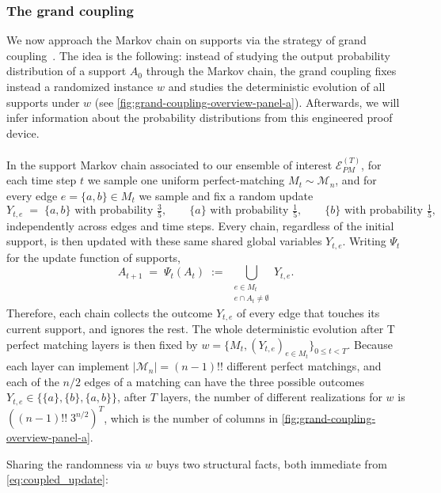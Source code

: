 \documentclass[
    aps,
    superscriptaddress,
    onecolumn,
    10pt,
    prx,
    nofootinbib
]{revtex4-2}
\theoremstyle{namedstatement}
\theoremstyle{plain}
\begin{document}
\subsubsection{The grand coupling}\label{sec:grandcoupling}
We now approach the Markov chain on supports via the strategy of grand coupling~\cite{LevinPeresWilmer2017}. The idea is the following: instead of studying the output probability distribution of a support $A_0$ through the Markov chain, the grand coupling fixes instead a randomized instance $w$ and studies the deterministic evolution of all supports under $w$ (see \cref{fig:grand-coupling-overview-panel-a}). Afterwards, we will infer information about the probability distributions from this engineered proof device.
\\
\\
In the support Markov chain associated to our ensemble of interest $\mathcal{E}_{PM}^{(T)}$, for each time step $t$ we sample one uniform perfect-matching $M_t \sim \mathcal{M}_n$, and for every edge $e = \{a,b\} \in M_t$ we sample and fix a random update
\begin{equation}\label{eq:shared_variables}
    Y_{t,e} \;=\;
    \{a,b\} \text{ with probability } \tfrac{3}{5},
    \qquad
    \{a\} \text{ with probability } \tfrac{1}{5},
    \qquad
    \{b\} \text{ with probability } \tfrac{1}{5},
\end{equation}
independently across edges and time steps. Every chain, regardless of the initial support, is then updated with these same shared global variables $Y_{t,e}$. Writing $\Psi_t$ for the update function of supports,
\begin{equation}\label{eq:coupled_update}
    A_{t+1} \;=\; \Psi_t(A_t)
    \;:=\; \bigcup_{\substack{e \in M_t \\ e \cap A_t \neq \emptyset}} Y_{t,e}.
\end{equation}
Therefore, each chain collects the outcome $Y_{t,e}$ of every edge that touches its current support, and ignores the rest. The whole deterministic evolution after T perfect matching layers is then fixed by $w=\{M_t,(Y_{t,e})_{e\in M_t}\}_{0\leq t < T}$. Because each layer can implement $|\mathcal{M}_n|=(n-1)!!$ different perfect matchings, and each of the $n/2$ edges of a matching can have the three possible outcomes $Y_{t,e}\in \{\{a\},\{b\},\{a,b\}\}$, after $T$ layers, the number of different realizations for $w$ is $((n-1)!! \;3^{n/2})^T$, which is the number of columns in \cref{fig:grand-coupling-overview-panel-a}.

Sharing the randomness via $w$ buys two structural facts, both immediate from \cref{eq:coupled_update}:
\end{document}
